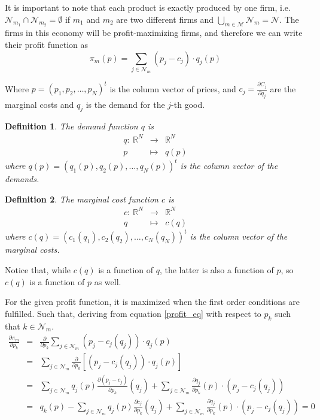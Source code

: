 \documentclass[12pt]{article}
\newtheorem{defi}{{Definition}}
\begin{document}
It is important to note that each product is exactly produced by one firm, i.e.  $\mathcal{N}_{m_1} \cap \mathcal{N}_{m_2} = \emptyset$ if $m_1$ and $m_2$ are two different firms and $\bigcup\limits_{m\in\mathcal{M}} \mathcal{N}_m = \mathcal{N}$. The firms in this economy will be profit-maximizing firms, and therefore we can write their profit function as
\begin{equation}
\pi_m(p) = \sum_{j \in \mathcal{N}_m} (p_j - c_j) \cdot q_j(p) \label{profit_eq}
\end{equation}

Where $p = (p_1, p_2, \dots, p_N)^t$ is the column vector of prices, and $c_j = \frac{\partial C_j}{\partial q_j}$ are the marginal costs and $q_j$ is the demand for the $j$-th good. 

\begin{defi}
The demand function $q$ is
\begin{eqnarray*}
q: ~ \mathbb{R}^N & \rightarrow & \mathbb{R}^N \\
p & \mapsto & q(p)
\end{eqnarray*}
where $q(p) = (q_1(p), q_2(p), \dots, q_N(p))^t$ is the column vector of the demands.
\end{defi}

\begin{defi}
The marginal cost function $c$ is
\begin{eqnarray*}
c: ~ \mathbb{R}^N & \rightarrow & \mathbb{R}^N \\
q & \mapsto & c(q)
\end{eqnarray*}
where $c(q) = (c_1(q_1), c_2(q_2), \dots, c_N(q_N))^t$ is the column vector of the marginal costs.
\end{defi}

Notice that, while $c(q)$ is a function of $q$, the latter is also a function of $p$, so $c(q)$ is a function of $p$ as well. 

For the given profit function, it is maximized when the first order conditions are fulfilled. Such that, deriving from equation \ref{profit_eq} with respect to $p_k$ such that $k \in \mathcal{N}_m$.
\begin{eqnarray}
\frac{\partial \pi_m}{\partial p_k} &=& \frac{\partial}{\partial p_k} \sum_{j \in \mathcal{N}_m} (p_j - c_j(q_j)) \cdot q_j(p) \\
&=& \sum_{j \in \mathcal{N}_m} \frac{\partial}{\partial p_k} \left[(p_j - c_j(q_j)) \cdot q_j(p)\right] \\
&=& \sum_{j \in \mathcal{N}_m} q_j(p) \frac{\partial (p_j - c_j)}{\partial p_k}(q_j) + \sum_{j \in \mathcal{N}_m} \frac{\partial q_j}{\partial p_k}(p) \cdot (p_j - c_j(q_j))\\
&=& q_k(p) - \sum_{j \in \mathcal{N}_m} q_j(p) \frac{\partial c_j}{\partial p_k} (q_j) + \sum_{j \in \mathcal{N}_m} \frac{\partial q_j}{\partial p_k}(p) \cdot (p_j - c_j(q_j)) = 0 \label{profit_FOC_eq}
\end{eqnarray}
\end{document}
